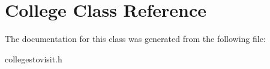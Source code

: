 \hypertarget{class_college}{}\section{College Class Reference}
\label{class_college}


The documentation for this class was generated from the following file\+:\begin{DoxyCompactItemize}
\item 
collegestovisit.\+h\end{DoxyCompactItemize}
